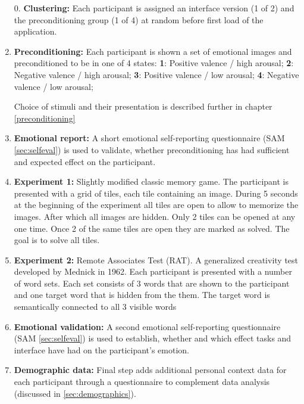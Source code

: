 	\begin{enumerate}
		
		\item[0.] \textbf{Clustering:} Each participant is assigned an interface version (1 of 2) and the preconditioning group (1 of 4) at random before first load of the application.
		
		\item \textbf{Preconditioning:} Each participant is shown a set of emotional images and preconditioned to be in one of 4 states:
			\textbf{1}: Positive valence / high arousal;
			\textbf{2}: Negative valence / high arousal;
			\textbf{3}: Positive valence / low arousal;
			\textbf{4}: Negative valence / low arousal;
			
		Choice of stimuli and their presentation is described further in chapter \ref{preconditioning}
			
		\item \textbf{Emotional report:} A short emotional self-reporting questionnaire (SAM \ref{sec:selfeval}) is used to validate, whether preconditioning has had sufficient and expected effect on the participant.
		
		\item \textbf{Experiment 1:} Slightly modified classic memory game. The participant is presented with a grid of tiles, each tile containing an image. During 5 seconds at the beginning of the experiment all tiles are open to allow to memorize the images. After which all images are hidden. Only 2 tiles can be opened at any one time. Once 2 of the same tiles are open they are marked as solved. The goal is to solve all tiles.
		
		\item \textbf{Experiment 2:} Remote Associates Test (RAT). A generalized creativity test developed by Mednick \cite{Mednick1962} in 1962. Each participant is presented with a number of word sets. Each set consists of 3 words that are shown to the participant and one target word that is hidden from the them. The target word is semantically connected to all 3 visible words
		
		\item \textbf{Emotional validation:} A second emotional self-reporting questionnaire (SAM \ref{sec:selfeval}) is used to establish, whether and which effect tasks and interface have had on the participant's emotion.
		
		\item \textbf{Demographic data:} Final step adds additional personal context data for each participant through a questionnaire to complement data analysis (discussed in \ref{sec:demographics}).
		
	\end{enumerate}
	
